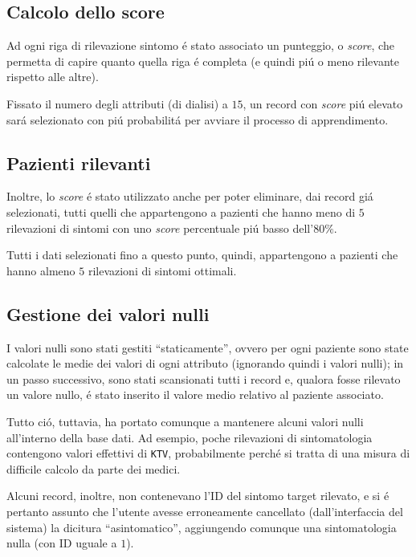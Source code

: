 \documentclass[preprint]{acm_proc_article-sp}
\begin{document}
\subsection{Calcolo dello score}
Ad ogni riga di rilevazione sintomo \'e stato associato un punteggio, o \textit{score}, che permetta di capire quanto quella riga \'e completa (e quindi pi\'u o meno rilevante rispetto alle altre).

Fissato il numero degli attributi (di dialisi) a $15$, un record con \textit{score} pi\'u elevato sar\'a selezionato con pi\'u probabilit\'a per avviare il processo di apprendimento.

\subsection{Pazienti rilevanti}
Inoltre, lo \textit{score} \'e stato utilizzato anche per poter eliminare, dai record gi\'a selezionati, tutti quelli che appartengono a pazienti che hanno meno di $5$ rilevazioni di sintomi con uno \textit{score} percentuale pi\'u basso dell'$80\%$.

Tutti i dati selezionati fino a questo punto, quindi, appartengono a pazienti che hanno almeno $5$ rilevazioni di sintomi ottimali.

\subsection{Gestione dei valori nulli}
I valori nulli sono stati gestiti ``staticamente'', ovvero per ogni paziente sono state calcolate le medie dei valori di ogni attributo (ignorando quindi i valori nulli); in un passo successivo, sono stati scansionati tutti i record e, qualora fosse rilevato un valore nullo, \'e stato inserito il valore medio relativo al paziente associato.

Tutto ci\'o, tuttavia, ha portato comunque a mantenere alcuni valori nulli all'interno della base dati. Ad esempio, poche rilevazioni di sintomatologia contengono valori effettivi di \verb|KTV|, probabilmente perch\'e si tratta di una misura di difficile calcolo da parte dei medici.

Alcuni record, inoltre, non contenevano l'ID del sintomo target rilevato, e si \'e pertanto assunto che l'utente avesse erroneamente cancellato (dall'interfaccia del sistema) la dicitura ``asintomatico'', aggiungendo comunque una sintomatologia nulla (con ID uguale a $1$).
\end{document}

